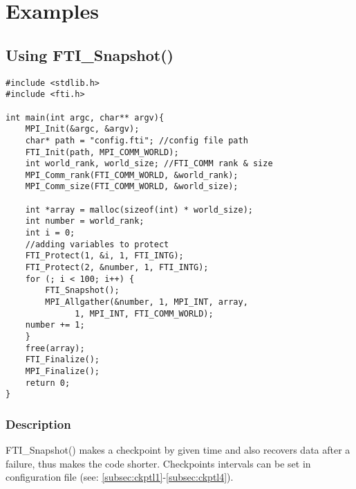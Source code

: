 \documentclass{refrep}
\begin{document}
\chapter{Examples}\label{ch:example}
\section{Using FTI\_Snapshot()}\label{subsec:usingsnapshot}
\begin{center}
\begin{lstlisting}[frame=single]
#include <stdlib.h>
#include <fti.h>

int main(int argc, char** argv){
    MPI_Init(&argc, &argv);
    char* path = "config.fti"; //config file path
    FTI_Init(path, MPI_COMM_WORLD);
    int world_rank, world_size; //FTI_COMM rank & size
    MPI_Comm_rank(FTI_COMM_WORLD, &world_rank);
    MPI_Comm_size(FTI_COMM_WORLD, &world_size);

    int *array = malloc(sizeof(int) * world_size);
    int number = world_rank;
    int i = 0;
    //adding variables to protect
    FTI_Protect(1, &i, 1, FTI_INTG);
    FTI_Protect(2, &number, 1, FTI_INTG);
    for (; i < 100; i++) {
        FTI_Snapshot();
        MPI_Allgather(&number, 1, MPI_INT, array,
		      1, MPI_INT, FTI_COMM_WORLD);
	number += 1;
    }
    free(array);
    FTI_Finalize();
    MPI_Finalize();
    return 0;
}
\end{lstlisting}
\end{center}
\subsection*{Description}
FTI\_Snapshot() makes a checkpoint by given time and also recovers data after a failure, thus makes the code shorter. Checkpoints intervals can be set in configuration file (see: \ref{subsec:ckptl1}-\ref{subsec:ckptl4}).
\newpage
\end{document}
